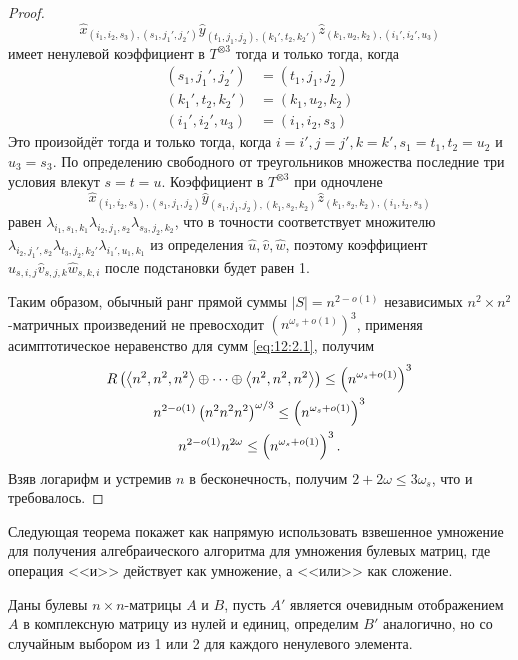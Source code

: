 \begin{proof}
  \[
  	\widehat{x}_{(i_1,i_2,s_3), (s_1,j_1',j_2')} \widehat{y}_{(t_1,j_1,j_2),(k_1',t_2,k_2')} \widehat{z}_{(k_1,u_2,k_2),(i_1',i_2',u_3)}
  \]
  имеет ненулевой коэффициент в $T^{\otimes 3}$ тогда и только тогда, когда 
  \begin{align*}
    (s_1,j_1',j_2') & = (t_1,j_1,j_2)\\
    (k_1',t_2,k_2') & = (k_1,u_2,k_2)\\
    (i_1',i_2',u_3) & = (i_1,i_2,s_3)
  \end{align*}
  Это произойдёт тогда и только тогда, когда $i=i', j=j',k=k',s_1=t_1,t_2=u_2$ и $u_3=s_3$. По определению свободного от треугольников множества последние три условия влекут $s=t=u$. Коэффициент в $T^{\otimes 3}$ при одночлене
  \[
  	\widehat{x}_{(i_1,i_2,s_3), (s_1,j_1,j_2)} \widehat{y}_{(s_1,j_1,j_2),(k_1,s_2,k_2)} \widehat{z}_{(k_1,s_2,k_2),(i_1,i_2,s_3)}
  \]
  равен $\lambda_{i_1,s_1,k_1} \lambda_{i_2,j_1,s_2} \lambda_{s_3,j_2,k_2}$, что в точности соответствует множителю $\lambda_{i_2,j_1',s_2} \lambda_{t_3,j_2,k_2'} \lambda_{i_1',u_1,k_1}$ из определения $\widehat{u}, \widehat{v}, \widehat{w}$, поэтому коэффициент $\widehat{u}_{s,i,j} \widehat{v}_{s,j,k} \widehat{w}_{s,k,i}$ после подстановки будет равен 1.
  
  Таким образом, обычный ранг прямой суммы $|S|=n^{2-o(1)}$ независимых $n^2 \times n^2$-матричных произведений не превосходит $\left(n^{\omega_s + o(1)}\right)^3$, применяя асимптотическое неравенство для сумм \eqref{eq:12:2.1}, получим
\begin{gather*}
	R\left(\left\langle n^2, n^2, n^2 \right\rangle \oplus \dotsb \oplus \left\langle n^2, n^2, n^2 \right\rangle\right) \leq \left(n^{\omega_s + o(1)}\right)^3\\
	n^{2-o(1)} \left( n^2 n^2 n^2 \right)^{\omega/3} \leq \left(n^{\omega_s + o(1)}\right)^3\\
	n^{2-o(1)} n^{2 \omega} \leq \left(n^{\omega_s + o(1)}\right)^3.
\end{gather*}
Взяв логарифм и устремив $n$ в бесконечность, получим $2+2\omega \leq 3 \omega_s$, что и требовалось. 
\end{proof}

Следующая теорема покажет как напрямую использовать взвешенное умножение для получения алгебраического алгоритма для умножения булевых матриц, где операция <<и>> действует как умножение, а <<или>> как сложение.

Даны булевы $n \times n$-матрицы $A$ и $B$, пусть $A'$ является очевидным отображением $A$ в комплексную матрицу из нулей и единиц, определим $B'$ аналогично, но со случайным выбором из 1 или 2 для каждого ненулевого элемента.

